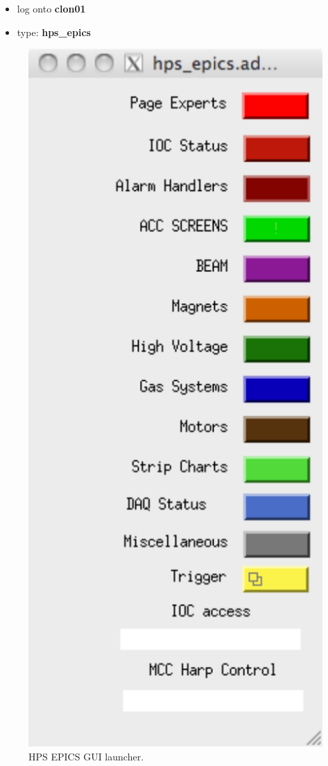 \documentclass[12pt]{article}
\begin{document}
\begin{itemize}
\item log onto \textbf{clon01}

\item type: \textbf{hps\_epics}
\end{itemize}
\begin{figure}[htp]
{\centering \includegraphics[scale=0.75]{hps_epics.pdf}\par}
\caption{\small{HPS EPICS GUI launcher.}}
\label{hps_epics}
\end{figure}
\end{document}
